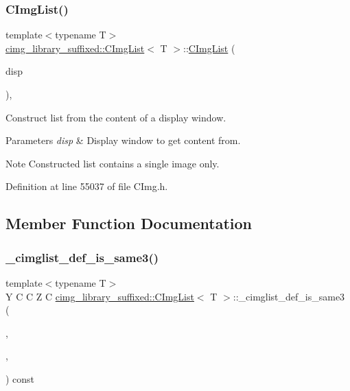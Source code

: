 \subsubsection{\texorpdfstring{C\+Img\+List()}{CImgList()}\hspace{0.1cm}{\footnotesize\ttfamily [19/19]}}
{\footnotesize\ttfamily template$<$typename T$>$ \\
\hyperlink{structcimg__library__suffixed_1_1CImgList}{cimg\+\_\+library\+\_\+suffixed\+::\+C\+Img\+List}$<$ T $>$\+::\hyperlink{structcimg__library__suffixed_1_1CImgList}{C\+Img\+List} (\begin{DoxyParamCaption}\item[{const \hyperlink{structcimg__library__suffixed_1_1CImgDisplay}{C\+Img\+Display} \&}]{disp }\end{DoxyParamCaption})\hspace{0.3cm}{\ttfamily [inline]}, {\ttfamily [explicit]}}



Construct list from the content of a display window. 


\begin{DoxyParams}{Parameters}
{\em disp} & Display window to get content from. \\
\hline
\end{DoxyParams}
\begin{DoxyNote}{Note}
Constructed list contains a single image only. 
\end{DoxyNote}


Definition at line 55037 of file C\+Img.\+h.



\subsection{Member Function Documentation}
\mbox{\label{structcimg__library__suffixed_1_1CImgList_af0433cdef08d554b33c9a541cebd8593}} 
\subsubsection{\texorpdfstring{\+\_\+cimglist\+\_\+def\+\_\+is\+\_\+same3()}{\_cimglist\_def\_is\_same3()}}
{\footnotesize\ttfamily template$<$typename T$>$ \\
Y C C Z C \hyperlink{structcimg__library__suffixed_1_1CImgList}{cimg\+\_\+library\+\_\+suffixed\+::\+C\+Img\+List}$<$ T $>$\+::\+\_\+cimglist\+\_\+def\+\_\+is\+\_\+same3 (\begin{DoxyParamCaption}\item[{Y}]{,  }\item[{Z}]{,  }\item[{C}]{ }\end{DoxyParamCaption}) const}



